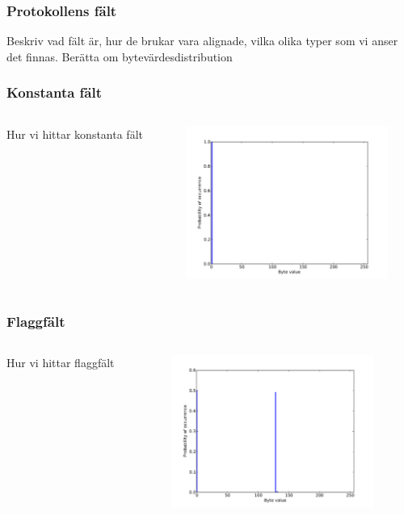 \documentclass[xetex]{beamer}
\begin{document}
    \begin{frame}
        \frametitle{Protokollens fält}
        Beskriv vad fält är, hur de brukar vara alignade, vilka olika typer
        som vi anser det finnas. Berätta om bytevärdesdistribution
    \end{frame}
    \begin{frame}
        \frametitle{Konstanta fält}
        \begin{columns}[t]
            \begin{column}[T]{6cm}
                Hur vi hittar konstanta fält
            \end{column}
            \begin{column}[T]{6cm}
                \includegraphics[height=5cm]{img/const_one.pdf}
            \end{column}
        \end{columns}
    \end{frame}
    \begin{frame}
        \frametitle{Flaggfält}
        \begin{columns}[t]
            \begin{column}[T]{6cm}
                Hur vi hittar flaggfält
            \end{column}
            \begin{column}[T]{6cm}
                \includegraphics[height=5cm]{img/flag.pdf}
            \end{column}
        \end{columns}
    \end{frame}
\end{document}
